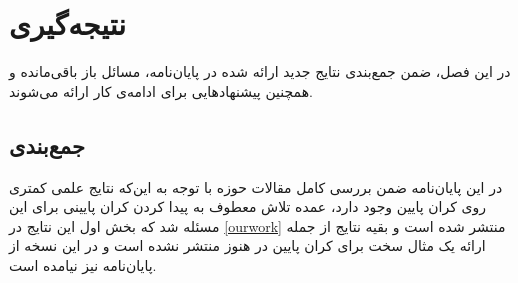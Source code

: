 \chapter{نتیجه‌گیری}
در این فصل، ضمن جمع‌بندی نتایج جدید ارائه شده در پایان‌نامه، مسائل باز باقی‌مانده و همچنین پیشنهادهایی برای ادامه‌ی کار ارائه می‌شوند.

\section{جمع‌بندی}
در این پایان‌نامه ضمن بررسی کامل مقالات حوزه
\picod
با توجه به این‌که نتایج علمی کمتری روی کران پایین وجود دارد، عمده تلاش معطوف به پیدا کردن کران پایینی برای این مسئله شد که بخش اول این نتایج در
\autoref{ourwork}
منتشر شده است و بقیه نتایج از جمله ارائه یک مثال سخت برای کران پایین در \picod هنوز منتشر نشده است و در این نسخه از پایان‌نامه نیز نیامده است.
